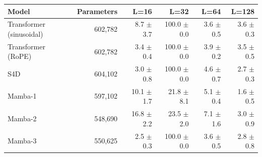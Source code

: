 \begin{tabular}{lrrrrr}
\toprule
Model & Parameters & L=16 & L=32 & L=64 & L=128 \\
\midrule
Transformer (sinusoidal) & 602,782 & 8.7 $\pm$ 3.7 & 100.0 $\pm$ 0.0 & 3.6 $\pm$ 0.5 & 3.6 $\pm$ 0.3 \\
Transformer (RoPE) & 602,782 & 3.4 $\pm$ 0.4 & 100.0 $\pm$ 0.0 & 3.9 $\pm$ 0.2 & 3.5 $\pm$ 0.5 \\
S4D & 604,102 & 3.0 $\pm$ 0.8 & 100.0 $\pm$ 0.0 & 4.6 $\pm$ 0.7 & 2.7 $\pm$ 0.3 \\
Mamba-1 & 597,102 & 10.1 $\pm$ 1.7 & 21.8 $\pm$ 8.1 & 5.1 $\pm$ 0.4 & 1.6 $\pm$ 0.5 \\
Mamba-2 & 548,690 & 16.8 $\pm$ 2.2 & 23.5 $\pm$ 2.0 & 7.1 $\pm$ 1.6 & 3.0 $\pm$ 0.9 \\
Mamba-3 & 550,625 & 2.5 $\pm$ 0.3 & 100.0 $\pm$ 0.0 & 3.6 $\pm$ 0.5 & 2.8 $\pm$ 0.8 \\
\bottomrule
\end{tabular}
\par{}
